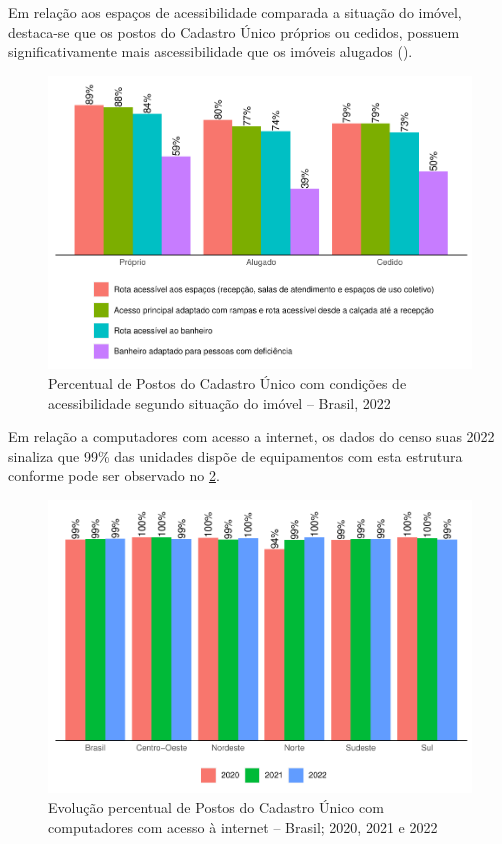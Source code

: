 \documentclass[
  brazilian]{report}
\begin{document}
Em relação aos espaços de acessibilidade comparada a situação do imóvel,
destaca-se que os postos do Cadastro Único próprios ou cedidos, possuem
significativamente mais ascessibilidade que os imóveis alugados
().

\begin{figure}
\includegraphics{Censo-SUAS-2022_files/figure-latex/postcad-acessibilidade-situacao-1} \caption[Percentual de Postos do Cadastro Único com condições de acessibilidade segundo situação do imóvel – Brasil, 2022]{Percentual de Postos do Cadastro Único com condições de acessibilidade segundo situação do imóvel – Brasil, 2022}\label{fig:postcad-acessibilidade-situacao}
\end{figure}

Em relação a computadores com acesso a internet, os dados do censo suas
2022 sinaliza que 99\% das unidades dispõe de equipamentos com esta
estrutura conforme pode ser observado no
\cref{fig:postcad-internet-percentual}.

\begin{figure}
\includegraphics{Censo-SUAS-2022_files/figure-latex/postcad-internet-percentual-1} \caption[Evolução percentual de Postos do Cadastro Único com computadores com acesso à internet – Brasil]{Evolução percentual de Postos do Cadastro Único com computadores com acesso à internet – Brasil;  2020, 2021 e 2022}\label{fig:postcad-internet-percentual}
\end{figure}
\end{document}
